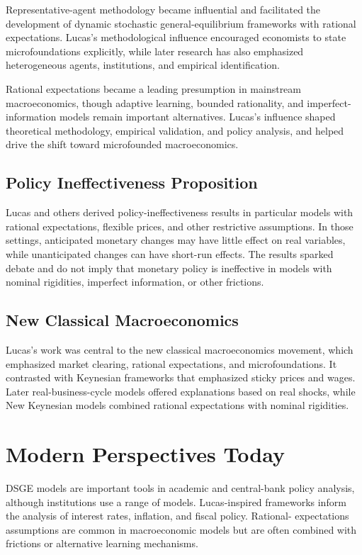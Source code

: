 Representative-agent methodology became influential and facilitated the
development of dynamic stochastic general-equilibrium frameworks with rational
expectations. Lucas's methodological influence encouraged economists to state
microfoundations explicitly, while later research has also emphasized
heterogeneous agents, institutions, and empirical identification.

Rational expectations became a leading presumption in mainstream macroeconomics,
though adaptive learning, bounded rationality, and imperfect-information models
remain important alternatives. Lucas's influence shaped theoretical methodology,
empirical validation, and policy analysis, and helped drive the shift toward
microfounded macroeconomics.

\subsection*{Policy Ineffectiveness Proposition}
Lucas and others derived policy-ineffectiveness results in particular models
with rational expectations, flexible prices, and other restrictive assumptions.
In those settings, anticipated monetary changes may have little effect on real
variables, while unanticipated changes can have short-run effects. The results
sparked debate and do not imply that monetary policy is ineffective in models
with nominal rigidities, imperfect information, or other frictions.

\subsection*{New Classical Macroeconomics}
Lucas's work was central to the new classical macroeconomics movement, which
emphasized market clearing, rational expectations, and microfoundations. It
contrasted with Keynesian frameworks that emphasized sticky prices and wages.
Later real-business-cycle models offered explanations based on real shocks,
while New Keynesian models combined rational expectations with nominal
rigidities.

\section{Modern Perspectives Today}
DSGE models are important tools in academic and central-bank policy analysis,
although institutions use a range of models. Lucas-inspired frameworks inform
the analysis of interest rates, inflation, and fiscal policy. Rational-
expectations assumptions are common in macroeconomic models but are often
combined with frictions or alternative learning mechanisms.

